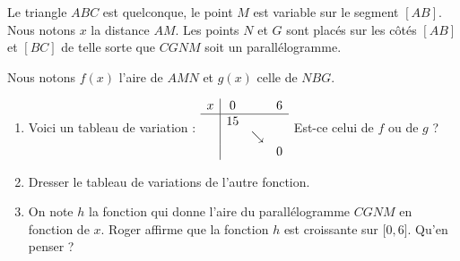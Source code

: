 
\begin{exercice}\label{exosmath-0657}


Le triangle \( ABC\) est quelconque, le point \( M\) est variable sur le segment \( [AB]\). Nous notons \( x\) la distance \( AM\). Les points \( N\) et \( G\) sont placés sur les côtés \( [AB]\) et \( [BC]\) de telle sorte que \( CGNM\) soit un parallélogramme.

Nous notons \( f(x)\) l'aire de \( AMN\) et \( g(x)\) celle de \( NBG\).

    \begin{center}
   
    \end{center}

\begin{enumerate}
    \item
        Voici un tableau de variation :
        \(
            \begin{array}[]{c|ccc}
                x&0&&6\\
                \hline
                &15&&\\
                &&\searrow&\\
                &&&0\\
            \end{array}
 \)
        Est-ce celui de \( f\) ou de \( g\) ?
    \item
        Dresser le tableau de variations de l'autre fonction.
    \item
        On note \( h\) la fonction qui donne l'aire du parallélogramme \( CGNM\) en fonction de \( x\). Roger affirme que la fonction \( h\) est croissante sur \( \mathopen[ 0 , 6 \mathclose]\). Qu'en penser ?
\end{enumerate}

\end{exercice}
